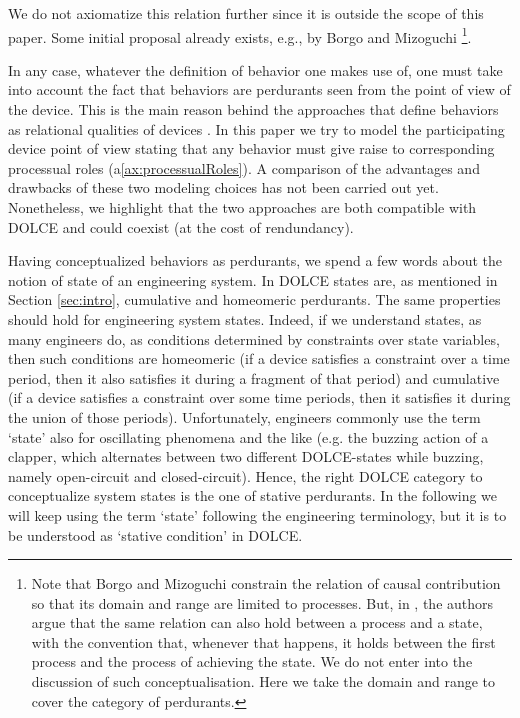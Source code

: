 \documentclass[sw]{iosart2x}
\newcommand{\AxLabel}{\textrm{a}}
\newcommand{\refax}[1]{({\AxLabel}\ref{#1})}
\newcommand{\generalStyle}[1]{\texttt{#1}}
\newcommand{\uniRel}[2]{\generalStyle{#1}(#2)}
\newcommand{\DOLCE}{\textsc{DOLCE}\xspace} %
\newcommand{\DOLCEStative}[1]{\uniRel{{STV}}{#1}}
\newcommand{\quotes}[1]{`#1'}
\begin{document}
We do not axiomatize this relation further since it is outside the scope of this paper. Some initial proposal already exists, e.g., by Borgo and Mizoguchi \cite{borgoFirstorderFormalizationEvent2014}\footnote{Note that Borgo and Mizoguchi constrain the relation of causal contribution so that its domain and range are limited to processes. But, in \cite{mizoguchiUnifyingDefinitionArtifact2016}, the authors argue that the same relation can also hold between a process and a state, with the convention that, whenever that happens, it holds between the first process and the process of achieving the state.
We do not enter into the discussion of such conceptualisation. Here we take the domain and range to cover the category of perdurants.}.

In any case, whatever the definition of behavior one makes use of, one must take into account the fact that behaviors are perdurants seen from the point of view of the device. This is the main reason behind the approaches that define behaviors as relational qualities of devices \cite{borgoFormalOntologicalPerspective2009}. In this paper we try to model the participating device point of view stating that any behavior must give raise to corresponding processual roles \refax{ax:processualRoles}. A comparison of the advantages and drawbacks of these two modeling choices has not been carried out yet. Nonetheless, we highlight that the two approaches are both compatible with \DOLCE and could coexist (at the cost of rendundancy).


Having conceptualized behaviors as perdurants, we spend a few words about the notion of state of an engineering system.
In \DOLCE states are, as mentioned in Section \ref{sec:intro}, cumulative and homeomeric perdurants.
The same properties should hold for engineering system states.
Indeed, if we understand states, as many engineers do, as conditions determined by constraints over state variables, then such conditions are homeomeric (if a device satisfies a constraint over a time period, then it also satisfies it during a fragment of that period) and cumulative (if a device satisfies a constraint over some time periods, then it satisfies it during the union of those periods).
Unfortunately, engineers commonly use the term \quotes{state} also for oscillating phenomena and the like (e.g. the buzzing action of a clapper, which alternates between two different \DOLCE-states while buzzing, namely open-circuit and closed-circuit). 
Hence, the right \DOLCE category to conceptualize system states is the one of stative perdurants. 
In the following we will keep using the term \quotes{state} following the engineering terminology, but it is to be understood as \quotes{stative condition} in \DOLCE. %
\end{document}
